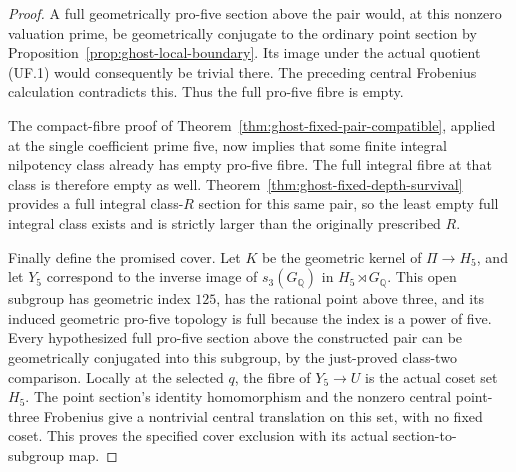\begin{proof}
A full geometrically pro-five section
above the pair would, at this nonzero
valuation prime, be geometrically
conjugate to the ordinary point
section by
Proposition~\ref{prop:ghost-local-boundary}.
Its image under the actual quotient
(UF.1) would consequently be trivial
there. The preceding central Frobenius
calculation contradicts this. Thus
the full pro-five fibre is empty.

The compact-fibre proof of
Theorem~\ref{thm:ghost-fixed-pair-compatible},
applied at the single coefficient
prime five, now implies that some
finite integral nilpotency class
already has empty pro-five fibre.
The full integral fibre at that
class is therefore empty as well.
Theorem~\ref{thm:ghost-fixed-depth-survival}
provides a full integral class-\(R\)
section for this same pair, so the
least empty full integral class
exists and is strictly larger than
the originally prescribed \(R\).

Finally define the promised cover.
Let \(K\) be the geometric kernel
of \(\Pi\to H_5\), and let \(Y_5\)
correspond to the inverse image of
\(s_3(G_{\mathbb Q})\) in
\(H_5\rtimes G_{\mathbb Q}\).
This open subgroup has geometric
index \(125\), has the rational
point above three, and its induced
geometric pro-five topology is full
because the index is a power of five.
Every hypothesized full pro-five
section above the constructed pair
can be geometrically conjugated into
this subgroup, by the just-proved
class-two comparison. Locally at
the selected \(q\), the fibre of
\(Y_5\to U\) is the actual coset
set \(H_5\). The point section's
identity homomorphism and the
nonzero central point-three
Frobenius give a nontrivial central
translation on this set, with no
fixed coset. This proves the
specified cover exclusion with
its actual section-to-subgroup map.
\end{proof}
